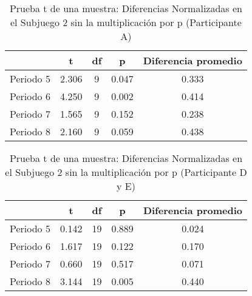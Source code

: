 \begin{table}[h]
\caption[Prueba t de una muestra: Diferencias Normalizadas en el Subjuego 2 sin la multiplicación por p (Participante A)]{Prueba t de una muestra: Diferencias Normalizadas en el Subjuego 2 sin la multiplicación por p (Participante A)}
\label{DN-S1}
\centering
\begin{tabular}{l | c c c | c}
\toprule
\textbf{} & \textbf{t} & \textbf{df} & \textbf{p} & \textbf{Diferencia promedio}\\
\midrule
Periodo 5 & 2.306 & 9 & 0.047 & 0.333\\
Periodo 6 & 4.250 & 9 & 0.002 & 0.414\\
Periodo 7 & 1.565 & 9 & 0.152 & 0.238\\
Periodo 8 & 2.160 & 9 & 0.059 & 0.438\\
\bottomrule
\end{tabular}
\end{table}













\begin{table}[h]
\caption[Prueba t de una muestra: Diferencias Normalizadas en el Subjuego 2 sin la multiplicación por p (Participantes D y E)]{Prueba t de una muestra: Diferencias Normalizadas en el Subjuego 2 sin la multiplicación por p (Participante D y E)}
\label{DN-S1}
\centering
\begin{tabular}{l | c c c | c}
\toprule
\textbf{} & \textbf{t} & \textbf{df} & \textbf{p} & \textbf{Diferencia promedio}\\
\midrule
Periodo 5 & 0.142 & 19 & 0.889 & 0.024\\
Periodo 6 & 1.617 & 19 & 0.122 & 0.170\\
Periodo 7 & 0.660 & 19 & 0.517 & 0.071\\
Periodo 8 & 3.144 & 19 & 0.005 & 0.440\\
\bottomrule
\end{tabular}
\end{table}













